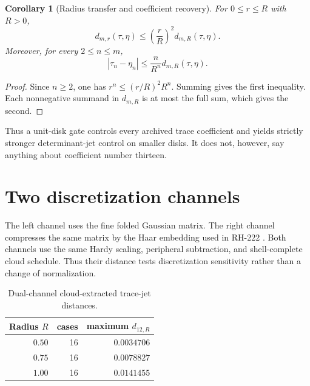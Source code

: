 \documentclass[11pt]{article}
\newtheorem{corollary}[theorem]{Corollary}
\theoremstyle{remark}
\begin{document}
\begin{corollary}[Radius transfer and coefficient recovery]\label{cor:radius}
For $0\le r\le R$ with $R>0$,
\[
 d_{m,r}(\tau,\eta)
 \le \left(\frac rR\right)^2d_{m,R}(\tau,\eta).
\]
Moreover, for every $2\le n\le m$,
\[
 |\tau_n-\eta_n|
 \le \frac{n}{R^n}d_{m,R}(\tau,\eta).
\]
\end{corollary}

\begin{proof}
Since $n\ge2$, one has
$r^n\le(r/R)^2R^n$.  Summing gives the first inequality.  Each nonnegative
summand in $d_{m,R}$ is at most the full sum, which gives the second.
\end{proof}

Thus a unit-disk gate controls every archived trace coefficient and yields
strictly stronger determinant-jet control on smaller disks.  It does not,
however, say anything about coefficient number thirteen.

\section{Two discretization channels}

The left channel uses the fine folded Gaussian matrix.  The right channel
compresses the same matrix by the Haar embedding used in RH-222
\citep{WangRH222}.  Both channels use the same Hardy scaling, peripheral
subtraction, and shell-complete cloud schedule.  Thus their distance tests
discretization sensitivity rather than a change of normalization.

\begin{table}[ht]
\centering
\small
\begin{tabular}{rrr}
\toprule
Radius $R$ & cases & maximum $d_{12,R}$\\
\midrule
$0.50$ & 16 & $0.0034706$\\
$0.75$ & 16 & $0.0078827$\\
$1.00$ & 16 & $0.0141455$\\
\bottomrule
\end{tabular}
\caption{Dual-channel cloud-extracted trace-jet distances.}
\end{table}
\end{document}
